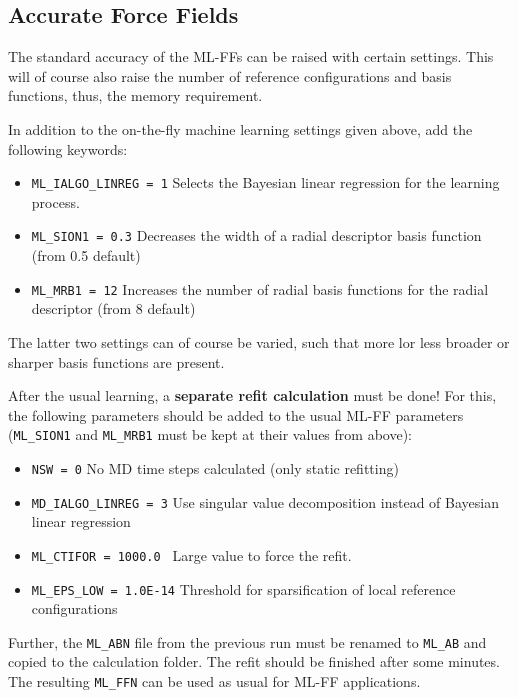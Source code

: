 \documentclass[a4paper,11pt]{article}
\begin{document}
 
\subsection{Accurate Force Fields}

The standard accuracy of the ML-FFs can be raised with certain settings. This will of course also raise the number 
of reference configurations and basis functions, thus, the memory requirement. 

In addition to the on-the-fly machine learning settings given above, add the following keywords:

\begin{itemize}
 \item \texttt{ML\_IALGO\_LINREG = 1} Selects the Bayesian linear regression for the learning process.
 \item \texttt{ML\_SION1 = 0.3} Decreases the width of a radial descriptor basis function (from 0.5 default)
 \item \texttt{ML\_MRB1 = 12} Increases the number of radial basis functions for the radial descriptor (from 8 default)
\end{itemize}

The latter two settings can of course be varied, such that more lor less broader or sharper basis functions are present.

After the usual learning, a \textbf{separate refit calculation} must be done!
For this, the following parameters should be added to the usual ML-FF parameters (\texttt{ML\_SION1} and \texttt{ML\_MRB1} 
must be kept at their values from above):

\begin{itemize}
 \item \texttt{NSW = 0} No MD time steps calculated (only static refitting)
 \item \texttt{MD\_IALGO\_LINREG = 3} Use singular value decomposition instead of Bayesian linear regression
 \item \texttt{ML\_CTIFOR = 1000.0 } Large value to force the refit.
 \item \texttt{ML\_EPS\_LOW = 1.0E-14} Threshold for sparsification of local reference configurations
\end{itemize}

Further, the \texttt{ML\_ABN} file from the previous run must be renamed to \texttt{ML\_AB} and copied to the calculation folder.
The refit should be finished after some minutes. The resulting \texttt{ML\_FFN} can be used as usual for ML-FF applications.
\end{document}
